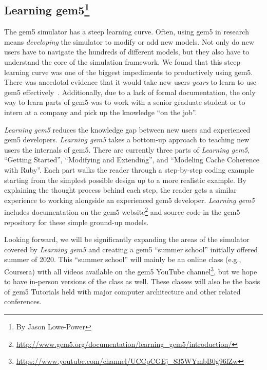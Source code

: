 \subsection[Learning gem5]{Learning gem5\footnote{By Jason Lowe-Power}}
\label{sec:learning}

The gem5 simulator has a steep learning curve.
Often, using gem5 in research means \emph{developing} the simulator to modify or add new models.
Not only do new users have to navigate the hundreds of different models, but they also have to understand the core of the simulation framework.
We found that this steep learning curve was one of the biggest impediments to productively using gem5.
There was anecdotal evidence that it would take new users \emph{years} to learn to use gem5 effectively~\cite{Power-gem5horrors-2015}.
Additionally, due to a lack of formal documentation, the only way to learn parts of gem5 was to work with a senior graduate student or to intern at a company and pick up the knowledge ``on the job''.

\emph{Learning gem5} reduces the knowledge gap between new users and experienced gem5 developers.
\emph{Learning gem5} takes a bottom-up approach to teaching new users the internals of gem5.
There are currently three parts of \emph{Learning gem5}, ``Getting Started'', ``Modifying and Extending'', and ``Modeling Cache Coherence with Ruby''.
Each part walks the reader through a step-by-step coding example starting from the simplest possible design up to a more realistic example.
By explaining the thought process behind each step, the reader gets a similar experience to working alongside an experienced gem5 developer.
\emph{Learning gem5} includes documentation on the gem5 website\footnote{\url{http://www.gem5.org/documentation/learning_gem5/introduction/}} and source code in the gem5 repository for these simple ground-up models.

Looking forward, we will be significantly expanding the areas of the simulator covered by \emph{Learning gem5} and creating a gem5 ``summer school'' initially offered summer of 2020.
This ``summer school'' will mainly be an online class (e.g., Coursera) with all videos available on the gem5 YouTube channel\footnote{\url{https://www.youtube.com/channel/UCCpCGEj_835WYmbB0g96lZw}}, but we hope to have in-person versions of the class as well.
These classes will also be the basis of gem5 Tutorials held with major computer architecture and other related conferences.
